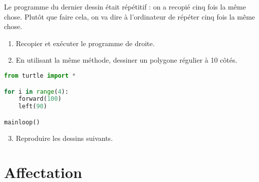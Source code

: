\documentclass[12pt]{article}
\begin{document}
\begin{multicols}{2}
Le programme du dernier dessin était répétitif : on a recopié cinq fois la même chose. Plutôt que faire cela, on va dire à l'ordinateur de répéter cinq fois la même chose.

\begin{enumerate}
  \item Recopier et exécuter le programme de droite.
  \item En utilisant la même méthode, dessiner un polygone régulier à 10 côtés.
\end{enumerate}

\columnbreak

\begin{lstlisting}[language=python,frame=single]
from turtle import *

for i in range(4):
    forward(100)
    left(90)

mainloop()
\end{lstlisting}
\end{multicols}

\begin{enumerate}
  \setcounter{enumi}{2}
  \item Reproduire les dessins suivants.
\end{enumerate}


\section{Affectation}

~
\end{document}
